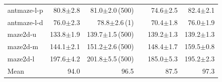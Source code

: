 \begin{tabular}{l rr r rr}
antmaze-l-p & 80.8{\scriptsize$\pm$2.8} & 81.0{\scriptsize$\pm$2.0}\,{\scriptsize(500)} & & 74.6{\scriptsize$\pm$2.5} & 82.4{\scriptsize$\pm$2.1} \\
antmaze-l-d & 76.0{\scriptsize$\pm$2.3} & 78.8{\scriptsize$\pm$2.6}\,{\scriptsize(1)} & & 70.4{\scriptsize$\pm$1.8} & 76.0{\scriptsize$\pm$1.9} \\
maze2d-u & 133.8{\scriptsize$\pm$1.9} & 139.7{\scriptsize$\pm$1.5}\,{\scriptsize(500)} & & 139.2{\scriptsize$\pm$1.3} & 139.2{\scriptsize$\pm$1.3} \\
maze2d-m & 144.1{\scriptsize$\pm$2.1} & 151.2{\scriptsize$\pm$2.6}\,{\scriptsize(500)} & & 148.4{\scriptsize$\pm$1.7} & 159.5{\scriptsize$\pm$0.8} \\
maze2d-l & 197.6{\scriptsize$\pm$4.2} & 201.8{\scriptsize$\pm$5.5}\,{\scriptsize(500)} & & 185.0{\scriptsize$\pm$5.3} & 195.2{\scriptsize$\pm$2.3} \\
\midrule
Mean & 94.0 & 96.5 & & 87.5 & 97.3 \\
\bottomrule
\end{tabular}
